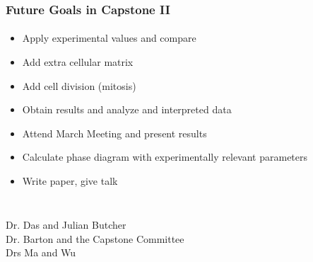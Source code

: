 \documentclass{beamer}
\begin{document}
  \begin{frame}
    \frametitle{Future Goals in Capstone II}
    \framesubtitle{}

    \begin{itemize}\itemsep1pt \parskip0pt
      \item Apply experimental values and compare
      \item Add extra cellular matrix
      \item Add cell division (mitosis)
      \item Obtain results and analyze and interpreted  data
      \item Attend March Meeting and present results
      \item Calculate phase diagram with experimentally relevant parameters
      \item Write paper, give talk
    \end{itemize}
    
    \vfill
  \end{frame}
  
  \begin{frame}
    \frametitle{}
    \framesubtitle{}

     \\
    \vspace{0.5in}
    Dr. Das and Julian Butcher \\
    Dr. Barton and the Capstone Committee \\
    Drs Ma and Wu
    
    \vfill
  \end{frame}
  
    
\end{document}
